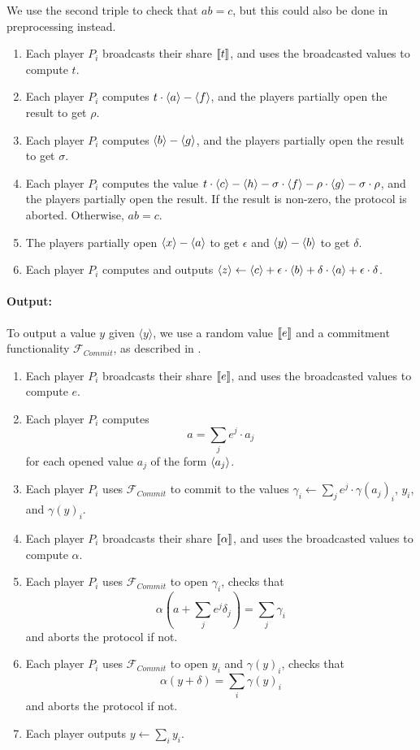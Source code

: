 \documentclass[../main.tex]{subfiles}
\begin{document}
We use the second triple to check that $ab = c$, but this could also be done in preprocessing instead.

\begin{enumerate}
    \item Each player $P_i$ broadcasts their share $[\![ t ]\!]$, and uses the broadcasted values to compute $t$.
    \item Each player $P_i$ computes $t \cdot \langle a \rangle - \langle f \rangle$, and the players partially open the result to get $\rho$.
    \item Each player $P_i$ computes $\langle b \rangle - \langle g \rangle$, and the players partially open the result to get $\sigma$.
    \item Each player $P_i$ computes the value $t \cdot \langle c \rangle - \langle h \rangle - \sigma \cdot \langle f \rangle - \rho \cdot \langle g \rangle - \sigma \cdot \rho$, and the players partially open the result. If the result is non-zero, the protocol is aborted. Otherwise, $a b = c$.
    \item The players partially open $\langle x \rangle - \langle a \rangle$ to get $\epsilon$ and $\langle y \rangle - \langle b \rangle$ to get $\delta$.
    \item Each player $P_i$ computes and outputs $\langle z \rangle \gets \langle c \rangle + \epsilon \cdot \langle b \rangle + \delta \cdot \langle a \rangle + \epsilon \cdot \delta$.
\end{enumerate}

\paragraph{Output:}
To output a value $y$ given $\langle y \rangle$, we use a random value $[\![ e ]\!]$ and a commitment functionality $\mathcal{F}_{Commit}$, as described in \cite{damgaard2012multiparty}.

\begin{enumerate}
    \item Each player $P_i$ broadcasts their share $[\![ e ]\!]$, and uses the broadcasted values to compute $e$.
    \item Each player $P_i$ computes \[ a = \sum_j e^j \cdot a_j \] for each opened value $a_j$ of the form $\langle a_j \rangle$.
    \item Each player $P_i$ uses $\mathcal{F}_{Commit}$ to commit to the values $\gamma_i \gets \sum_j e^j \cdot \gamma(a_j)_i$, $y_i$, and $\gamma(y)_i$.
    \item Each player $P_i$ broadcasts their share $[\![ \alpha ]\!]$, and uses the broadcasted values to compute $\alpha$.
    \item Each player $P_i$ uses $\mathcal{F}_{Commit}$ to open $\gamma_i$, checks that \[ \alpha(a + \sum_j e^j \delta_j) = \sum_j \gamma_i \] and aborts the protocol if not.
    \item Each player $P_i$ uses $\mathcal{F}_{Commit}$ to open $y_i$ and $\gamma(y)_i$, checks that \[ \alpha(y + \delta) = \sum_i \gamma(y)_i \] and aborts the protocol if not.
    \item Each player outputs $y \gets \sum_i y_i$.
\end{enumerate}
\end{document}
